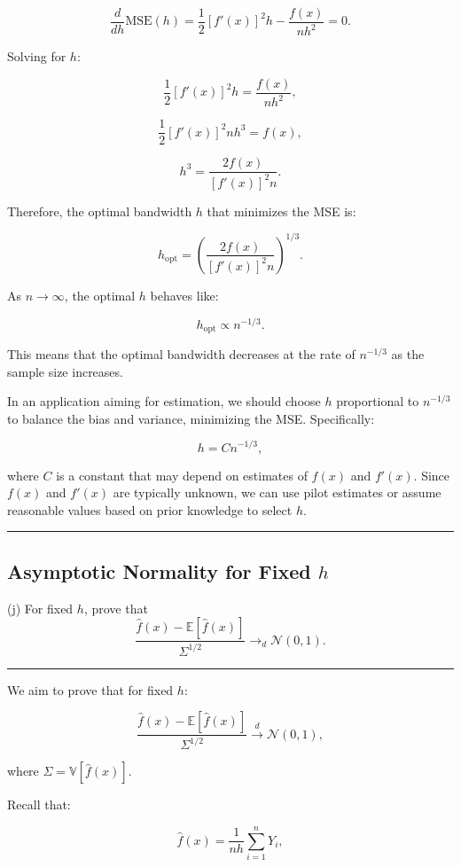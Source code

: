 \documentclass{article}
\newenvironment{colorparagraph}[1]{\par\color{#1}}{\par}
\begin{document}
\[
\frac{d}{d h} \text{MSE}(h) = \frac{1}{2} [f'(x)]^2 h - \frac{f(x)}{n h^2} = 0.
\]

Solving for \( h \):

\[
\frac{1}{2} [f'(x)]^2 h = \frac{f(x)}{n h^2},
\]

\[
\frac{1}{2} [f'(x)]^2 n h^3 = f(x),
\]

\[
h^3 = \frac{2 f(x)}{[f'(x)]^2 n}.
\]

Therefore, the optimal bandwidth \( h \) that minimizes the MSE is:

\[
h_{\text{opt}} = \left( \frac{2 f(x)}{[f'(x)]^2 n} \right)^{1/3}.
\]

As \( n \to \infty \), the optimal \( h \) behaves like:

\[
h_{\text{opt}} \propto n^{-1/3}.
\]

This means that the optimal bandwidth decreases at the rate of \( n^{-1/3} \) as the sample size increases.

In an application aiming for estimation, we should choose \( h \) proportional to \( n^{-1/3} \) to balance the bias and variance, minimizing the MSE. Specifically:

\[
h = C n^{-1/3},
\]

where \( C \) is a constant that may depend on estimates of \( f(x) \) and \( f'(x) \). Since \( f(x) \) and \( f'(x) \) are typically unknown, we can use pilot estimates or assume reasonable values based on prior knowledge to select \( h \).

\begin{colorparagraph}{questioncolor}
\label{q2j}
\rule{\textwidth}{0.5pt}
\subsection{Asymptotic Normality for Fixed \( h \)}
(j) For fixed \( h \), prove that
\[
\frac{\hat{f}(x) - \mathbb{E}[\hat{f}(x)]}{\Sigma^{1/2}} \to_d \mathcal{N}(0, 1).
\]

\rule{\textwidth}{0.5pt}
\end{colorparagraph}

We aim to prove that for fixed \( h \):

\[
\frac{\hat{f}(x) - \mathbb{E}[\hat{f}(x)]}{\Sigma^{1/2}} \xrightarrow{d} \mathcal{N}(0, 1),
\]

where \(\Sigma = \mathbb{V}[\hat{f}(x)]\).

Recall that:

\[
\hat{f}(x) = \frac{1}{n h} \sum_{i=1}^n Y_i,
\]
\end{document}
